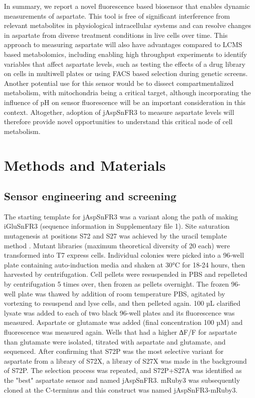 \documentclass[9pt,lineno]{elife}
\begin{document}
In summary, we report a novel fluorescence based biosensor that enables dynamic measurements of aspartate.
This tool is free of significant interference from relevant metabolites in physiological intracellular systems and can resolve changes in aspartate from diverse treatment conditions in live cells over time.
This approach to measuring aspartate will also have advantages compared to LCMS based metabolomics, including enabling high throughput experiments to identify variables that affect aspartate levels, such as testing the effects of a drug library on cells in multiwell plates or using FACS based selection during genetic screens.
Another potential use for this sensor would be to dissect compartmentalized metabolism, with mitochondria being a critical target, although incorporating the influence of pH on sensor fluorescence will be an important consideration in this context.
Altogether, adoption of jAspSnFR3 to measure aspartate levels will therefore provide novel opportunities to understand this critical node of cell metabolism.



\section{Methods and Materials}

\subsection{Sensor engineering and screening}
The starting template for jAspSnFR3 was a variant along the path of making iGluSnFR3 (sequence information in Supplementary file 1).
Site saturation mutagenesis at positions S72 and S27 was achieved by the uracil template method \citep{Kunkel1985-ev}.
Mutant libraries (maximum theoretical diversity of 20 each) were transformed into T7 express cells.
Individual colonies were picked into a 96-well plate containing auto-induction media \citep{Studier2005-ki} and shaken at 30°C for 18-24 hours, then harvested by centrifugation.
Cell pellets were resuspended in PBS and repelleted by centrifugation 5 times over, then frozen as pellets overnight.
The frozen 96-well plate was thawed by addition of room temperature PBS, agitated by vortexing to resuspend and lyse cells, and then pelleted again.
100 µL clarified lysate was added to each of two black 96-well plates and its fluorescence was measured.
Aspartate or glutamate was added (final concentration 100 µM) and fluorescence was measured again.
Wells that had a higher ∆F/F for aspartate than glutamate were isolated, titrated with aspartate and glutamate, and sequenced.
After confirming that S72P was the most selective variant for aspartate from a library of S72X, a library of S27X was made in the background of S72P.
The selection process was repeated, and S72P+S27A was identified as the "best" aspartate sensor and named jAspSnFR3.
mRuby3 was subsequently cloned at the C-terminus and this construct was named jAspSnFR3-mRuby3.
\end{document}
